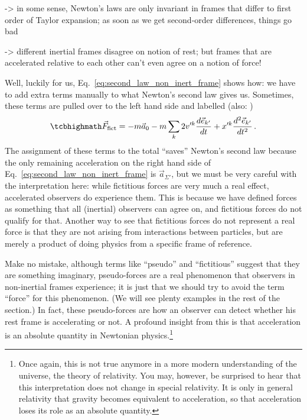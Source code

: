 \documentclass[../class_mech_main.tex]{subfiles}
\begin{document}
-> in some sense, Newton's laws are only invariant in frames that differ to first order of Taylor expansion; as soon as we get second-order differences, things go bad

-> different inertial frames disagree on notion of rest; but frames that are accelerated relative to each other can't even agree on a notion of force!



Well, luckily for us, Eq.~\eqref{eq:second_law_non_inert_frame} shows how: we have to add extra terms manually to what Newton's second law gives us. Sometimes, these terms are pulled over to the left hand side and labelled  (also: )
\begin{equation}\label{eq:pseudo_force_general}
	\eqbox{
		\vec{F}_\mathrm{fict}
		= - m \vec{a}_0 - m \sum_k 2 v'^k \dv{\unitvec{k'}}{t} + x'^k \dv[2]{\unitvec{k'}}{t}
	}	\, .
\end{equation}
The assignment of these terms to the total \enquote{saves} Newton's second law because the only remaining acceleration on the right hand side of Eq.~\eqref{eq:second_law_non_inert_frame} is $\vec{a}_{\Sigma'}$, but we must be very careful with the interpretation here: while fictitious forces are very much a real effect, accelerated observers do experience them. This is because we have defined forces as something that all (inertial) observers can agree on, and fictitious forces do not qualify for that. Another way to see that fictitious forces do not represent a real force is that they are not arising from interactions between particles, but are merely a product of doing physics from a specific frame of reference.




Make no mistake, although terms like \enquote{pseudo} and \enquote{fictitious} suggest that they are something imaginary, pseudo-forces are a real phenomenon that observers in non-inertial frames experience; it is just that we should try to avoid the term \enquote{force} for this phenomenon. (We will see plenty examples in the rest of the section.) In fact, these pseudo-forces are how an observer can detect whether his rest frame is accelerating or not. A profound insight from this is that acceleration is an absolute quantity in Newtonian physics.\footnote{Once again, this is not true anymore in a more modern understanding of the universe, the theory of relativity. You may, however, be surprised to hear that this interpretation does not change in special relativity. It is only in general relativity that gravity becomes equivalent to acceleration, so that acceleration loses its role as an absolute quantity.}
\end{document}
